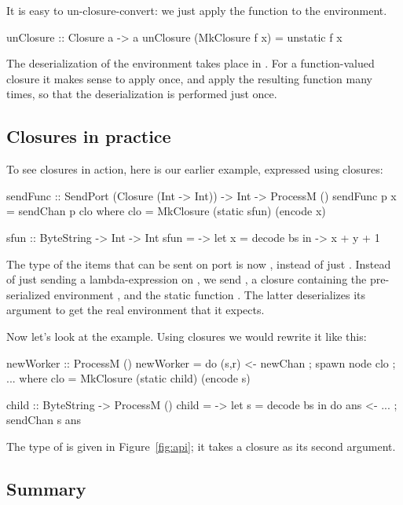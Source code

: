 \documentclass[preprint]{sigplanconf}
\begin{document}
It is easy to un-closure-convert: we just apply the function to the environment.
\begin{code}
  unClosure :: Closure a -> a
  unClosure (MkClosure f x) = unstatic f x
\end{code}
The deserialization of the environment takes place in .
For a function-valued closure it makes sense to apply  once, and
apply the resulting function many times, so that the deserialization is
performed just once.

\subsection{Closures in practice} 
\label{s:closures-in-practice}

To see closures in action, here is our earlier  example, 
expressed using closures:
\begin{code}
  sendFunc :: SendPort (Closure (Int -> Int)) 
                              -> Int -> ProcessM ()
  sendFunc p x = sendChan p clo
    where clo = MkClosure (static sfun) (encode x)

  sfun :: ByteString -> Int -> Int
  sfun = \bs -> let x = decode bs 
                in \y -> x + y + 1
\end{code}
The type of the items that can be sent on port  is now , instead of just .
Instead of just sending a lambda-expression on , we send , a
closure containing the pre-serialized environment ,
and the static function . The latter deserializes its
argument  to get the real environment  that it expects.

Now let's look at the  example.
Using closures we would rewrite it like this:
\begin{code}
  newWorker :: ProcessM ()
  newWorker = do { (s,r) <- newChan
                 ; spawn node clo
                 ; ... }
    where clo = MkClosure (static child) (encode s)

  child :: ByteString -> ProcessM ()
  child = \bs -> let s = decode bs
           		   in do { ans <- ...
               		     ; sendChan s ans }
\end{code}
The type of  is given in Figure~\ref{fig:api}; it takes
a closure as its second argument.

\subsection{Summary}
\end{document}
